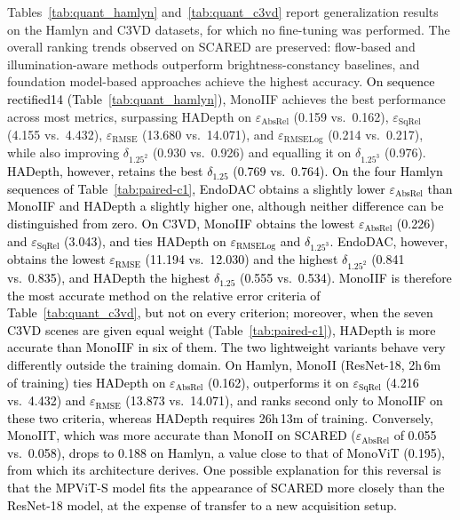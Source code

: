 \documentclass[a4paper,fleqn]{cas-dc}
\begin{document}
{Tables~\ref{tab:quant_hamlyn} and~\ref{tab:quant_c3vd} report generalization results on the Hamlyn and C3VD datasets, for which no fine-tuning was performed. The overall ranking trends observed on SCARED are preserved: flow-based and illumination-aware methods outperform brightness-constancy baselines, and foundation model-based approaches achieve the highest accuracy. 
\textcolor{black}{On sequence rectified14 (Table~\ref{tab:quant_hamlyn}),} MonoIIF achieves the best performance across most metrics, surpassing HADepth on $\varepsilon_\text{AbsRel}$ (0.159 vs.\ 0.162), $\varepsilon_\text{SqRel}$ (4.155 vs.\ 4.432), $\varepsilon_\text{RMSE}$ (13.680 vs.\ 14.071), and $\varepsilon_\text{RMSELog}$ (0.214 vs.\ 0.217), while also improving $\delta_{1.25^2}$ (0.930 vs.\ 0.926) and equalling it on $\delta_{1.25^3}$ (0.976). \textcolor{black}{HADepth, however, retains the best $\delta_{1.25}$ (0.769 vs.\ 0.764). On the four Hamlyn sequences of Table~\ref{tab:paired-c1}, EndoDAC obtains a slightly lower $\varepsilon_\textrm{AbsRel}$ than MonoIIF and HADepth a slightly higher one, although neither difference can be distinguished from zero.
On C3VD, MonoIIF obtains the lowest $\varepsilon_\textrm{AbsRel}$ (0.226) and $\varepsilon_\textrm{SqRel}$ (3.043), and ties HADepth on $\varepsilon_\textrm{RMSELog}$ and $\delta_{1.25^3}$. EndoDAC, however, obtains the lowest $\varepsilon_\textrm{RMSE}$ (11.194 vs.\ 12.030) and the highest $\delta_{1.25^2}$ (0.841 vs.\ 0.835), and HADepth the highest $\delta_{1.25}$ (0.555 vs.\ 0.534). MonoIIF is therefore the most accurate method on the relative error criteria of Table~\ref{tab:quant_c3vd}, but not on every criterion; moreover, when the seven C3VD scenes are given equal weight (Table~\ref{tab:paired-c1}), HADepth is more accurate than MonoIIF in six of them.}
\textcolor{black}
{
The two lightweight variants behave very differently outside the training domain. On Hamlyn, MonoII (ResNet-18, 2h\,6m of training) ties HADepth on $\varepsilon_\textrm{AbsRel}$ (0.162), outperforms it on $\varepsilon_\textrm{SqRel}$ (4.216 vs.\ 4.432) and $\varepsilon_\textrm{RMSE}$ (13.873 vs.\ 14.071), and ranks second only to MonoIIF on these two criteria, whereas HADepth requires 26h\,13m of training. Conversely, MonoIIT, which was more accurate than MonoII on SCARED ($\varepsilon_\textrm{AbsRel}$ of 0.055 vs.\ 0.058), drops to 0.188 on Hamlyn, a value close to that of MonoViT (0.195), from which its architecture derives. One possible explanation for this reversal is that the MPViT-S model fits the appearance of SCARED more closely than the ResNet-18 model, at the expense of transfer to a new acquisition setup.
}}
\end{document}
